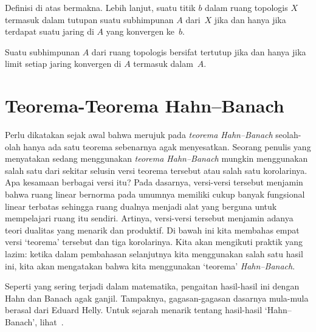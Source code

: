 \begin{prop}\label{C031481} Definisi di atas bermakna. Lebih lanjut, suatu titik $b$ dalam ruang topologis $X$ termasuk dalam
tutupan suatu subhimpunan $A$ dari~$X$ jika dan hanya jika terdapat suatu jaring di $A$ yang konvergen ke~$b$.
\end{prop}

\begin{cor} Suatu subhimpunan $A$ dari ruang topologis bersifat tertutup jika dan hanya jika limit setiap jaring konvergen di $A$ termasuk dalam~$A$.
\end{cor}



















\section{Teorema-Teorema Hahn--Banach}

Perlu dikatakan sejak awal bahwa merujuk pada \emph{teorema Hahn--Banach} seolah-olah hanya ada satu teorema sebenarnya agak menyesatkan.
Seorang penulis yang menyatakan sedang menggunakan \emph{teorema Hahn--Banach} mungkin menggunakan salah satu dari sekitar selusin versi
teorema tersebut atau salah satu korolarinya. Apa kesamaan berbagai versi itu? Pada dasarnya, versi-versi tersebut menjamin bahwa ruang
linear bernorma pada umumnya memiliki cukup banyak fungsional linear terbatas sehingga ruang dualnya menjadi alat yang berguna
untuk mempelajari ruang itu sendiri. Artinya, versi-versi tersebut menjamin adanya teori dualitas yang menarik dan produktif.
Di bawah ini kita membahas empat versi `teorema' tersebut dan tiga korolarinya. Kita akan mengikuti praktik yang lazim:
ketika dalam pembahasan selanjutnya kita menggunakan salah satu hasil ini, kita akan mengatakan bahwa kita menggunakan `teorema' \emph{Hahn--Banach}.

Seperti yang sering terjadi dalam matematika, pengaitan hasil-hasil ini dengan Hahn dan Banach agak ganjil. Tampaknya,
gagasan-gagasan dasarnya mula-mula berasal dari Eduard Helly. Untuk sejarah menarik tentang hasil-hasil `Hahn--Banach',
lihat~\cite{Hochstadt:1980}.

